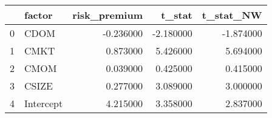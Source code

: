 \begin{tabular}{llrrr}
\toprule
 & factor & risk_premium & t_stat & t_stat_NW \\
\midrule
0 & CDOM & -0.236000 & -2.180000 & -1.874000 \\
1 & CMKT & 0.873000 & 5.426000 & 5.694000 \\
2 & CMOM & 0.039000 & 0.425000 & 0.415000 \\
3 & CSIZE & 0.277000 & 3.089000 & 3.000000 \\
4 & Intercept & 4.215000 & 3.358000 & 2.837000 \\
\bottomrule
\end{tabular}

